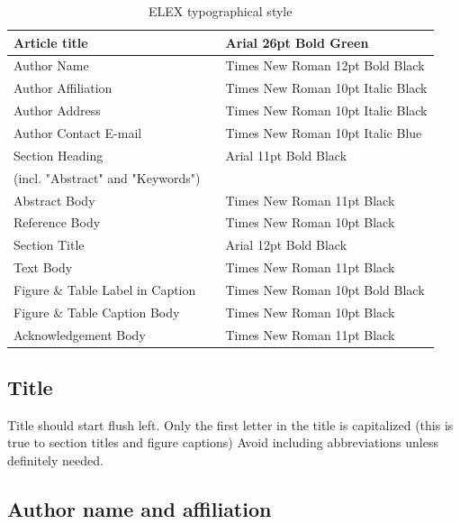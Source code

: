 \documentclass{elex}
\begin{document}
\begin{table}[ht]
\begin{center}
\caption{ELEX typographical style} \label{tab:style}
\begin{small}
\begin{tabular}{lcl}
\hline
Article title & \quad &  Arial 26pt Bold Green\\
\hline
Author Name & \quad & Times New Roman 12pt Bold Black\\
\hline
Author Affiliation & \quad & Times New Roman 10pt Italic Black\\
\hline
Author Address & \quad & Times New Roman 10pt Italic Black\\
\hline
Author Contact E-mail & \quad & Times New Roman 10pt Italic Blue\\
\hline
Section Heading & \quad & Arial 11pt Bold Black\\
(incl. "Abstract" and "Keywords") & & \\
\hline
Abstract Body & \quad & Times New Roman 11pt Black\\
\hline
Reference Body & \quad & Times New Roman 10pt Black\\
\hline
Section Title & \quad & Arial 12pt Bold Black\\
\hline
Text Body & \quad & Times New Roman 11pt Black\\
\hline
Figure \& Table Label in Caption & \quad & Times New Roman 10pt Bold Black\\
\hline
Figure \& Table Caption Body & \quad & Times New Roman 10pt Black\\
\hline
Acknowledgement Body & \quad & Times New Roman 11pt Black\\
\hline
\end{tabular}
\end{small}
\end{center}
\end{table}


\subsection{Title}

Title should start flush left.  Only the first letter in the title is capitalized (this is true to section titles and figure captions) Avoid including abbreviations unless definitely needed.


\subsection{Author name and affiliation}
\end{document}
